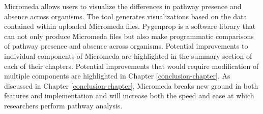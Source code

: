 Micromeda allows users to visualize the differences in pathway presence and 
absence across organisms. The tool generates visualizations based on the data 
contained within uploaded Micromeda files. Pygenprop is a software library that 
can not only produce Micromeda files but also make programmatic comparisons of 
pathway presence and absence across organisms. Potential improvements to 
individual components of Micromeda are highlighted in the summary section of 
each of their chapters. Potential improvements that would require modification 
of multiple components are highlighted in Chapter \ref{conclusion-chapter}. As 
discussed in Chapter \ref{conclusion-chapter}, Micromeda breaks new ground in 
both features and implementation and will increase both the speed and ease at 
which researchers perform pathway analysis.
